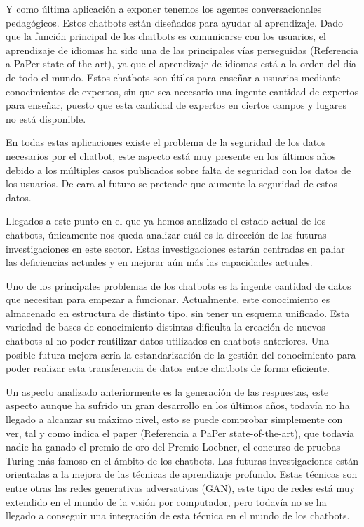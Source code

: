 Y como última aplicación a exponer tenemos los agentes conversacionales pedagógicos. Estos chatbots están diseñados para ayudar al aprendizaje. Dado que la función principal de los chatbots es comunicarse con los usuarios, el aprendizaje de idiomas ha sido una de las principales vías perseguidas (Referencia a PaPer state-of-the-art), ya que el aprendizaje de idiomas está a la orden del día de todo el mundo. Estos chatbots son útiles para enseñar a usuarios mediante conocimientos de expertos, sin que sea necesario una ingente cantidad de expertos para enseñar, puesto que esta cantidad de expertos en ciertos campos y lugares no está disponible.

En todas estas aplicaciones existe el problema de la seguridad de los datos necesarios por el chatbot, este aspecto está muy presente en los últimos años debido a los múltiples casos publicados sobre falta de seguridad con los datos de los usuarios. De cara al futuro se pretende que aumente la seguridad de estos datos.

Llegados a este punto en el que ya hemos analizado el estado actual de los chatbots, únicamente nos queda analizar cuál es la dirección de las futuras investigaciones en este sector. Estas investigaciones estarán centradas en paliar las deficiencias actuales y en mejorar aún más las capacidades actuales.

Uno de los principales problemas de los chatbots es la ingente cantidad de datos que necesitan para empezar a funcionar. Actualmente, este conocimiento es almacenado en estructura de distinto tipo, sin tener un esquema unificado. Esta variedad de bases de conocimiento distintas dificulta la creación de nuevos chatbots al no poder reutilizar datos utilizados en chatbots anteriores. Una posible futura mejora sería la estandarización de la gestión del conocimiento para poder realizar esta transferencia de datos entre chatbots de forma eficiente.

Un aspecto analizado anteriormente es la generación de las respuestas, este aspecto aunque ha sufrido un gran desarrollo en los últimos años, todavía no ha llegado a alcanzar su máximo nivel, esto se puede comprobar simplemente con ver, tal y como indica el paper (Referencia a PaPer state-of-the-art), que todavía nadie ha ganado el premio de oro del Premio Loebner, el concurso de pruebas Turing más famoso en el ámbito de los chatbots. Las futuras investigaciones están orientadas a la mejora de las técnicas de aprendizaje profundo. Estas técnicas son entre otras las redes generativas adversativas (GAN), este tipo de redes está muy extendido en el mundo de la visión por computador, pero todavía no se ha llegado a conseguir una integración de esta técnica en el mundo de los chatbots.

